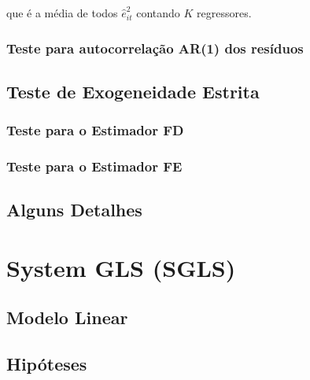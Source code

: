 \documentclass[11pt, oneside, a4paper, article]{article}
\numberwithin{equation}{section}
\begin{document}
\begin{description}
\noindent
que é a média de todos $\hat{e}^{2}_{it}$ contando $K$ regressores.

\subsubsection{Teste para autocorrelação AR(1) dos resíduos}

\subsection{Teste de Exogeneidade Estrita}

\subsubsection{Teste para o Estimador FD}

\subsubsection{Teste para o Estimador FE}


\subsection{Alguns Detalhes}

\clearpage
\section{System GLS (SGLS)}

\noindent
\citet[Sec.7.4 -- Consistency and Asymptotic Normality of Generalized Least Squares, p.153]{wool-2010} 

\subsection{Modelo Linear}

\subsection{Hipóteses}


\end{description}
\end{document}
